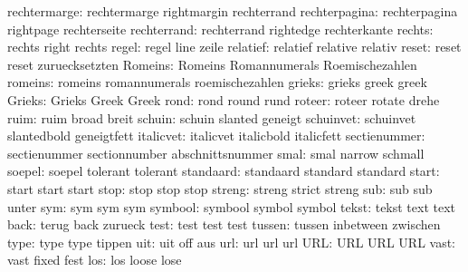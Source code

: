        rechtermarge:  rechtermarge         rightmargin         rechterrand
      rechterpagina:  rechterpagina        rightpage           rechterseite
        rechterrand:  rechterrand          rightedge           rechterkante
             rechts:  rechts               right               rechts
              regel:  regel                line                zeile
           relatief:  relatief             relative            relativ
              reset:  reset                reset               zuruecksetzten
            Romeins:  Romeins              Romannumerals       Roemischezahlen
            romeins:  romeins              romannumerals       roemischezahlen
             grieks:  grieks               greek               greek 
             Grieks:  Grieks               Greek               Greek 
               rond:  rond                 round               rund
             roteer:  roteer               rotate              drehe
               ruim:  ruim                 broad               breit
             schuin:  schuin               slanted             geneigt
          schuinvet:  schuinvet            slantedbold         geneigtfett
          italicvet:  italicvet            italicbold          italicfett
       sectienummer:  sectienummer         sectionnumber       abschnittsnummer
               smal:  smal                 narrow              schmall
             soepel:  soepel               tolerant            tolerant
          standaard:  standaard            standard            standard
              start:  start                start               start
               stop:  stop                 stop                stop
             streng:  streng               strict              streng
                sub:  sub                  sub                 unter
                sym:  sym                  sym                 sym
            symbool:  symbool              symbol              symbol
              tekst:  tekst                text                text
               back:  terug                back                zurueck
               test:  test                 test                test
             tussen:  tussen               inbetween           zwischen
               type:  type                 type                tippen
                uit:  uit                  off                 aus
                url:  url                  url                 url
                URL:  URL                  URL                 URL
               vast:  vast                 fixed               fest
                los:  los                  loose               lose 
